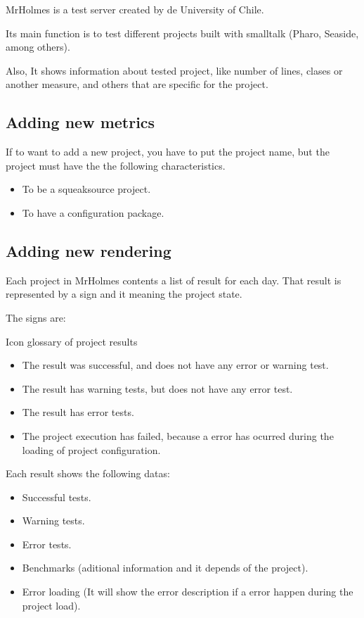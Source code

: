 \documentclass[runningheads]{llncs}
\begin{document}
MrHolmes is a test server created by de University of Chile.

Its main function is to test different projects built with smalltalk (Pharo, Seaside, among others).

Also, It shows information about tested project, like number of lines, clases or another measure, and others that are specific for the project.

\subsection{Adding new metrics}

If to want to add a new project, you have to put the project name, but the project must have 
the the following characteristics.

\begin{itemize}
\item To be a squeaksource project. 
\item To have a configuration package.
\end{itemize}

\subsection{Adding new rendering}

Each project in MrHolmes contents a list of result for each day. That result is represented by a sign and it meaning the project state.

The signs are:

Icon glossary of project results
\begin{itemize}
\item The result was successful, and does not have any error or warning test.
\item The result has warning tests, but does not have any error test.
\item The result has error tests.
\item The project execution has failed, because a error has ocurred during the loading of project configuration.
\end{itemize}

Each result shows the following datas:
\begin{itemize}
\item Successful tests.
\item Warning tests.
\item Error tests.
\item Benchmarks (aditional information and it depends of the project).
\item Error loading (It will show the error description if a error happen during the project load).
\end{itemize}
\end{document}
